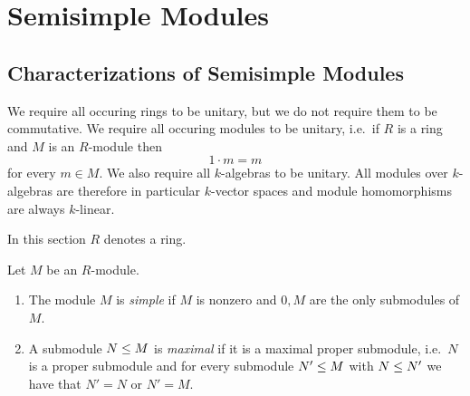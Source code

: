 \section{Semisimple Modules}





\subsection{Characterizations of Semisimple Modules}


\begin{conventions}
  We require all occuring rings to be unitary, but we do not require them to be commutative.
  We require all occuring modules to be unitary, i.e.\ if $R$ is a ring and $M$ is an $R$-module then
  \[
      1 \cdot m
    = m
  \]
  for every $m \in M$.
  We also require all $k$-algebras to be unitary.
  All modules over $k$-algebras are therefore in particular $k$-vector spaces and module homomorphisms are always $k$-linear.
\end{conventions}


\begin{conventions}
  In this section $R$ denotes a ring.
\end{conventions}


\begin{definition}
  \label{definition: simple and maximal modules}
  Let $M$ be an $R$-module.
  \begin{enumerate}
    \item
      The module $M$ is \emph{simple} if $M$ is nonzero and $0, M$ are the only submodules of $M$.
    \item
      A submodule $N \leq M$ is \emph{maximal} if it is a maximal proper submodule, i.e.\ $N$ is a proper submodule and for every submodule $N' \leq M$ with $N \leq N'$ we have that $N' = N$ or $N' = M$.
  \end{enumerate}
\end{definition}


